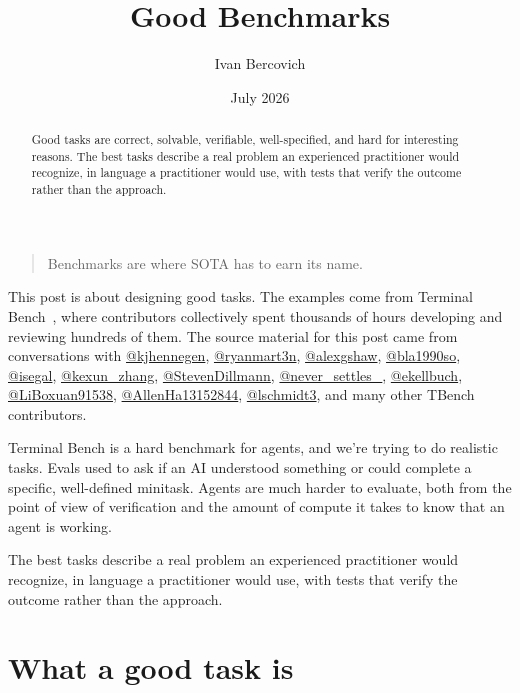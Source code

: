 \documentclass[11pt]{article}
\title{\textbf{Good Benchmarks}}
\author{Ivan Bercovich}
\date{July 2026}
\begin{document}
\maketitle

\begin{abstract}
\noindent
Good tasks are correct, solvable, verifiable, well-specified, and hard for interesting reasons. The best tasks describe a real problem an experienced practitioner would recognize, in language a practitioner would use, with tests that verify the outcome rather than the approach.
\end{abstract}

\begin{quote}
Benchmarks are where SOTA has to earn its name.
\end{quote}

This post is about designing good tasks. The examples come from Terminal Bench~\citep{tbench-original}, where contributors collectively spent thousands of hours developing and reviewing hundreds of them. The source material for this post came from conversations with \href{https://x.com/kjhennegen}{@kjhennegen}, \href{https://x.com/ryanmart3n}{@ryanmart3n}, \href{https://x.com/alexgshaw}{@alexgshaw}, \href{https://x.com/bla1990so}{@bla1990so}, \href{https://x.com/isegal}{@isegal}, \href{https://x.com/kexun_zhang}{@kexun\_zhang}, \href{https://x.com/StevenDillmann}{@StevenDillmann}, \href{https://x.com/never_settles_}{@never\_settles\_}, \mbox{\href{https://x.com/ekellbuch}{@ekellbuch}}, \href{https://x.com/LiBoxuan91538}{@LiBoxuan91538}, \href{https://x.com/AllenHa13152844}{@AllenHa13152844}, \href{https://x.com/lschmidt3}{@lschmidt3}, and many other TBench contributors.

Terminal Bench is a hard benchmark for agents, and we're trying to do realistic tasks. Evals used to ask if an AI understood something or could complete a specific, well-defined minitask. Agents are much harder to evaluate, both from the point of view of verification and the amount of compute it takes to know that an agent is working.

The best tasks describe a real problem an experienced practitioner would recognize, in language a practitioner would use, with tests that verify the outcome rather than the approach.

\section{What a good task is}
\end{document}
